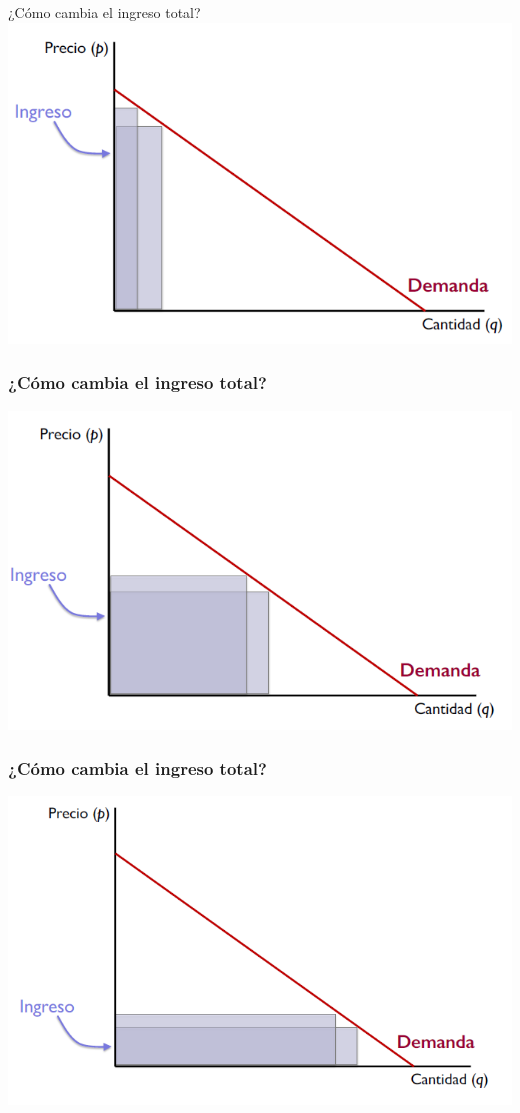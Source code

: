 \documentclass{beamer}
\begin{document}
\begin{frame}{¿Cómo cambia el ingreso total?}
    \centering
    \includegraphics[scale=0.6]{../Figures/Tema_06.30_ingresototal.png}
\end{frame}

\begin{frame}
\frametitle{¿Cómo cambia el ingreso total?}
\includegraphics[scale=0.6]{../Figures/Tema_06.31_ingresototal2.png}
\end{frame}

\begin{frame}
\frametitle{¿Cómo cambia el ingreso total?}
\includegraphics[scale=0.6]{../Figures/Tema_06.32_ingresototal3.png}
\end{frame}
\end{document}
